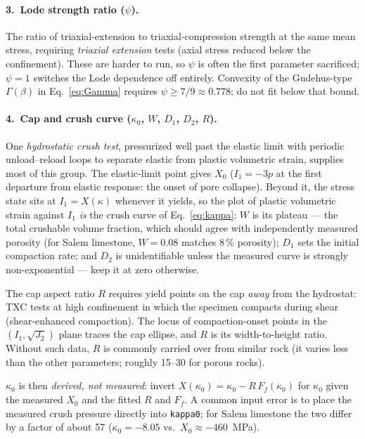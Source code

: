 \documentclass[12pt]{article}
\begin{document}
\paragraph{3.\ Lode strength ratio ($\psi$).}
The ratio of triaxial-extension to triaxial-compression strength at
the same mean stress, requiring \emph{triaxial extension} tests
(axial stress reduced below the confinement). These are harder to
run, so $\psi$ is often the first parameter sacrificed; $\psi = 1$
switches the Lode dependence off entirely. Convexity of the
Gudehus-type $\Gamma(\beta)$ in Eq.~\eqref{eq:Gamma} requires
$\psi \ge 7/9 \approx 0.778$; do not fit below that bound.

\paragraph{4.\ Cap and crush curve
($\kappa_0$, $W$, $D_1$, $D_2$, $R$).}
One \emph{hydrostatic crush test}, pressurized well past the elastic
limit with periodic unload--reload loops to separate elastic from
plastic volumetric strain, supplies most of this group. The
elastic-limit point gives $X_0$ ($I_1 = -3p$ at the first departure
from elastic response: the onset of pore collapse). Beyond it, the
stress state sits at $I_1 = X(\kappa)$ whenever it yields, so the
plot of plastic volumetric strain against $I_1$ \emph{is} the crush
curve of Eq.~\eqref{eq:kappa}: $W$ is its plateau --- the total
crushable volume fraction, which should agree with independently
measured porosity (for Salem limestone, $W = 0.08$ matches
$8\,\%$ porosity); $D_1$ sets the initial compaction rate; and $D_2$
is unidentifiable unless the measured curve is strongly
non-exponential --- keep it at zero otherwise.

The cap aspect ratio $R$ requires yield points on the cap \emph{away}
from the hydrostat: TXC tests at high confinement in which the
specimen compacts during shear (shear-enhanced compaction). The
locus of compaction-onset points in the $(I_1, \sqrt{J_2})$ plane
traces the cap ellipse, and $R$ is its width-to-height ratio.
Without such data, $R$ is commonly carried over from similar rock
(it varies less than the other parameters; roughly 15--30 for porous
rocks).

$\kappa_0$ is then \emph{derived, not measured}: invert
$X(\kappa_0) = \kappa_0 - R\,F_f(\kappa_0)$ for $\kappa_0$ given the
measured $X_0$ and the fitted $R$ and $F_f$. A common input error is
to place the measured crush pressure directly into \texttt{kappa0};
for Salem limestone the two differ by a factor of about 57
($\kappa_0 = -8.05$ vs.\ $X_0 \approx -460$~MPa).
\end{document}
